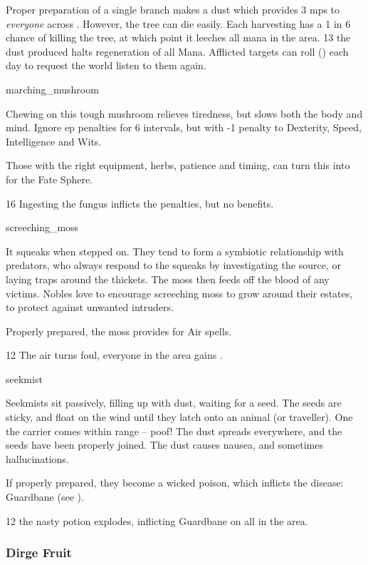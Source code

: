 \begin{multicols}{2}
{    Proper preparation of a single branch makes a dust which provides 3 \glspl{mp} to \emph{everyone} across .
    However, the tree can die easily.
    Each harvesting has a 1 in 6 chance of killing the tree, at which point it leeches all mana in the \gls{area}.
  }%
  {}%
  {13}%
  {the dust produced halts regeneration of all Mana.
  Afflicted targets can roll  (\tn[10]) each day to request the world listen to them again.}


%
  {marching_mushroom}%
  {
  Chewing on this tough mushroom relieves tiredness, but slows both the body and mind.
    Ignore \gls{ep} penalties for 6 \glspl{interval}, but with -1 penalty to Dexterity, Speed, Intelligence and Wits.

    Those with the right equipment, herbs, patience and timing, can turn this into  for the Fate Sphere.
    }
{}%
{16}%
{Ingesting the fungus inflicts the penalties, but no benefits.}%

%
  {screeching_moss}%
  {
  It squeaks when stepped on.
  They tend to form a symbiotic relationship with predators, who always respond to the squeaks by investigating the source, or laying traps around the thickets.
  The moss then feeds off the blood of any victims.
  Nobles love to encourage screeching moss to grow around their estates, to protect against unwanted intruders.

  Properly prepared, the moss provides  for Air spells.
    }
  {}%
  {12}%
  {The air turns foul, everyone in the \gls{area} gains .}%

%
  {seekmist}%
  {
  Seekmists sit passively, filling up with dust, waiting for a seed.
  The seeds are sticky, and float on the wind until they latch onto an animal (or traveller).
  One the carrier comes within range -- poof!
  The dust spreads everywhere, and the seeds have been properly joined.
  The dust causes nausea, and sometimes hallucinations.

  If properly prepared, they become a wicked poison, which inflicts the disease: Guardbane (see ).
    }
  {}%
  {12}%
  {the nasty potion explodes, inflicting Guardbane on all in the \gls{area}.}%

\subsubsection{Dirge Fruit}
\label{dirgeFruit}


\end{multicols}
